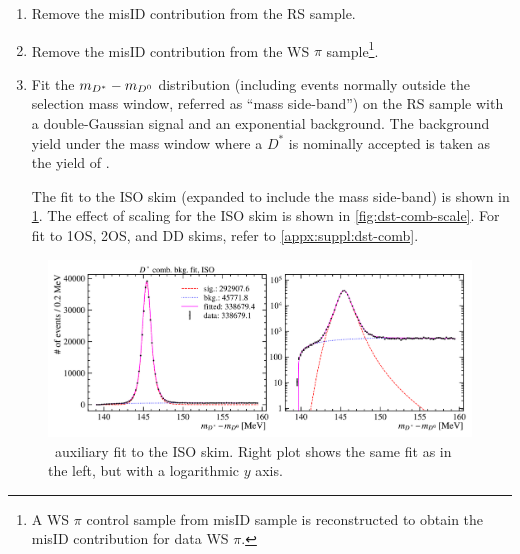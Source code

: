 \begin{enumerate}
    \item Remove the misID contribution from the RS sample.
    \item Remove the misID contribution from the WS $\pi$ sample\footnote{
            A WS $\pi$ control sample from misID sample is reconstructed to
            obtain the misID contribution for data WS $\pi$.
        }.
    \item Fit the $m_{{{D}^*}} - m_{{{D}^0}}$ distribution (including events normally
        outside the \Dstar selection mass window, referred as
        ``mass side-band'') on the RS sample with a
        double-Gaussian signal and an exponential background.
        The background yield under the mass window where a $D^*$ is nominally
        accepted is taken as the yield of \DstComb.

        The fit to the ISO skim (expanded to include the mass side-band) is
        shown in \cref{fig:dst-comb-fit}.
        The effect of scaling for the ISO skim is shown in
        \cref{fig:dst-comb-scale}.
        For fit to 1OS, 2OS, and DD skims, refer to \cref{appx:suppl:dst-comb}.
\end{enumerate}


\begin{figure}[!htb]
    \centering
    \includegraphics[width=\textwidth]{figs-fit-fit-templates/data-driven-plots/dst_comb/fit_dst_comb_iso_comb.pdf}
    \caption{
        \DstComb\ auxiliary fit to the ISO skim.
        Right plot shows the same fit as in the left, but with a logarithmic $y$
        axis.
    }
    \label{fig:dst-comb-fit}
\end{figure}

